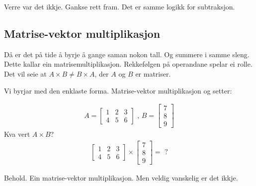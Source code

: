 \documentclass[12pt]{article}
\newcommand\x{\times}
\begin{document}
Verre var det ikkje. Gankse rett fram.
Det er samme logikk for subtraksjon.

\subsection*{Matrise-vektor multiplikasjon}

Då er det på tide å byrje å gange saman nokon tall.
Og summere i samme sleng. Dette kallar ein matrisemultiplikasjon.
Rekkefølgen på operandane spelar ei rolle. Det vil seie at
$A \x B \neq B \x A$, der $A$ og $B$ er matriser.

Vi byrjar med den enklaste forma. Matrise-vektor multiplikasjon og
setter:

\begin{gather*}
A = \left[ 
\begin{array}{ccc}
1 & 2 & 3 \\
4 & 5 & 6
\end{array}
 \right] \text{ , } B = 
\left[ 
\begin{array}{ccc}
7 \\
8 \\
9
\end{array}
\right]
\end{gather*}
Kva vert $A \x B$?
\begin{gather*}
\left[ 
\begin{array}{ccc}
1 & 2 & 3 \\
4 & 5 & 6
\end{array}
 \right] \x
\left[ 
\begin{array}{ccc}
7 \\
8 \\
9
\end{array}
\right] =\text{ ?}
\end{gather*}

Behold. Ein matrise-vektor multiplikasjon. Men veldig vanskelig er det ikkje.

\begin{comment}
\begin{gather*}
\left[ 
\begin{array}{ccc}
1 & 2 & 3 \\
4 & 5 & 6
\end{array}
 \right] \x
\left[ 
\begin{array}{ccc}
7 & 8 & 9
\end{array}
\right] =\text{ ?}
\end{gather*}
\end{comment}
\end{document}
